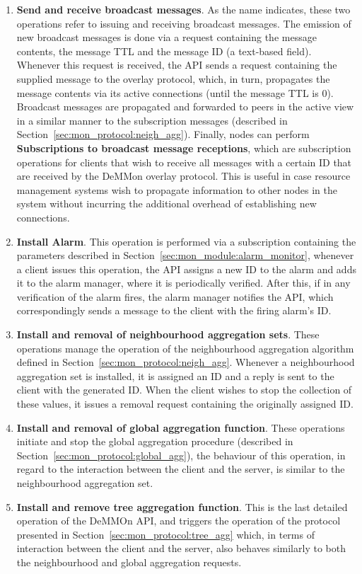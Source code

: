 \begin{enumerate}
    \item \textbf{Send and receive broadcast messages}. As the name indicates, these two operations refer to issuing and receiving broadcast messages. The emission of new broadcast messages is done via a request containing the message contents, the message TTL and the message ID (a text-based field). Whenever this request is received, the API sends a request containing the supplied message to the overlay protocol, which, in turn, propagates the message contents via its active connections (until the message TTL is 0). Broadcast messages are propagated and forwarded to peers in the active view in a similar manner to the subscription messages (described in Section~\ref{sec:mon_protocol:neigh_agg}). Finally, nodes can perform \textbf{Subscriptions to broadcast message receptions}, which are subscription operations for clients that wish to receive all messages with a certain ID that are received by the DeMMon overlay protocol. This is useful in case resource management systems wish to propagate information to other nodes in the system without incurring the additional overhead of establishing new connections.
    
    \item \textbf{Install Alarm}. This operation is performed via a subscription containing the parameters described in Section~\ref{sec:mon_module:alarm_monitor}, whenever a client issues this operation, the API assigns a new ID to the alarm and adds it to the alarm manager, where it is periodically verified. After this, if in any verification of the alarm fires, the alarm manager notifies the API, which correspondingly sends a message to the client with the firing alarm's ID.

    \item \textbf{Install and removal of neighbourhood aggregation sets}. These operations manage the operation of the neighbourhood aggregation algorithm defined in Section~\ref{sec:mon_protocol:neigh_agg}. Whenever a neighbourhood aggregation set is installed, it is assigned an ID and a reply is sent to the client with the generated ID. When the client wishes to stop the collection of these values, it issues a removal request containing the originally assigned ID.

    \item \textbf{Install and removal of global aggregation function}. These operations initiate and stop the global aggregation procedure (described in Section~\ref{sec:mon_protocol:global_agg}), the behaviour of this operation, in regard to the interaction between the client and the server, is similar to the neighbourhood aggregation set. 
    
    \item \textbf{Install and remove tree aggregation function}. This is the last detailed operation of the DeMMOn API, and triggers the operation of the protocol presented in Section~\ref{sec:mon_protocol:tree_agg} which, in terms of interaction between the client and the server, also behaves similarly to both the neighbourhood and global aggregation requests.
    
\end{enumerate}

